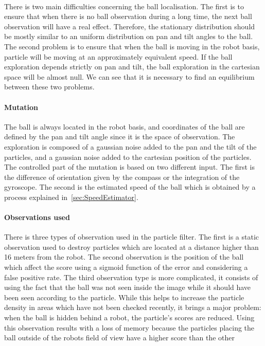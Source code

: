 \documentclass[a4paper,12pt]{article}
\begin{document}
\paragraph{}
There is two main difficulties concerning the ball localisation. The first is
to ensure that when there is no ball observation during a long time, the next
ball observation will have a real effect. Therefore, the stationary
distribution should be mostly similar to an uniform distribution on pan and tilt
angles to the ball. The second problem is to ensure that when the ball is moving
in the robot basis, particle will be moving at an approximately equivalent
speed. If the ball exploration depends strictly on pan and tilt, the ball
exploration in the cartesian space will be almost null. We can see that it is
necessary to find an equilibrium between these two problems.

\paragraph{Mutation}
The ball is always located in the robot basis, and coordinates of the ball are
defined by the pan and tilt angle since it is the space of observation. The
exploration is composed of a gaussian noise added to the pan and the tilt of the
particles, and a gaussian noise added to the cartesian position of the
particles. The controlled part of the mutation is based on two different input.
The first is the difference of orientation given by the compass or the
integration of the gyroscope. The second is the estimated speed of the ball
which is obtained by a process explained in~\ref{sec:SpeedEstimator}.

\paragraph{Observations used}
There is three types of observation used in the particle filter. The first is a
static observation used to destroy particles which are located at a distance
higher than 16 meters from the robot. The second observation is the position of
the ball which affect the score using a sigmoid function of the error and
considering a false positive rate. The third observation type is more
complicated, it consists of using the fact that the ball was not seen inside the
image while it should have been seen according to the particle. While this helps
to increase the particle density in areas which have not been checked recently,
it brings a major problem: when the ball is hidden behind a robot, the
particle's scores are reduced. Using this observation results with a loss of
memory because the particles placing the ball outside of the robots field of
view have a higher score than the other
\end{document}
